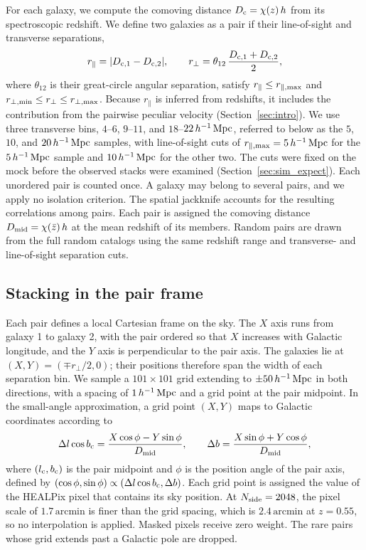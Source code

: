 For each galaxy, we compute the comoving distance $D_{\rm c}=\chi(z)\,h$ from
its spectroscopic redshift. We define two galaxies as a pair if their
line-of-sight and transverse separations,
\begin{equation}
  r_{\parallel} = |D_{{\rm c},1}-D_{{\rm c},2}|, \qquad
  r_{\perp} = \theta_{12}\,\frac{D_{{\rm c},1}+D_{{\rm c},2}}{2},
  \label{eq:separations}
\end{equation}
where $\theta_{12}$ is their great-circle angular separation, satisfy
$r_{\parallel}\leq r_{\parallel,{\rm max}}$ and
$r_{\perp,{\rm min}}\leq r_{\perp}\leq r_{\perp,{\rm max}}$. Because
$r_{\parallel}$ is inferred from redshifts, it includes the contribution from
the pairwise peculiar velocity (Section~\ref{sec:intro}). We
use three transverse bins, $4$--$6$, $9$--$11$, and $18$--$22\,h^{-1}\,{\rm Mpc}$,
referred to below as the $5$, $10$, and $20\,h^{-1}\,{\rm Mpc}$ samples, with
line-of-sight cuts of $r_{\parallel,{\rm max}}=5\,h^{-1}\,{\rm Mpc}$ for the
$5\,h^{-1}\,{\rm Mpc}$ sample and $10\,h^{-1}\,{\rm Mpc}$ for the other two. The cuts were
fixed on the mock before the observed stacks were examined
(Section~\ref{sec:sim_expect}). Each unordered pair is counted once. A
galaxy may belong to several pairs, and we apply no isolation criterion. The
spatial jackknife accounts for the resulting correlations among pairs. Each
pair is assigned the comoving distance
$D_{\rm mid}=\chi(\bar z)\,h$ at the mean redshift of its members. Random
pairs are drawn from the full random catalogs using the same redshift range
and transverse- and line-of-sight separation cuts.

\subsection{Stacking in the pair frame}
\label{sec:stacking}

Each pair defines a local Cartesian frame on the sky. The $X$ axis runs from
galaxy 1 to galaxy 2, with the pair ordered so that $X$ increases with
Galactic longitude, and the $Y$ axis is perpendicular to the pair axis. The
galaxies lie at $(X,Y)=(\mp r_{\perp}/2,0)$; their positions therefore span
the width of each separation bin. We sample a $101\times101$ grid extending
to $\pm50\,h^{-1}\,{\rm Mpc}$ in both directions, with a spacing of
$1\,h^{-1}\,{\rm Mpc}$ and a grid point at the pair midpoint. In the small-angle
approximation, a grid point $(X,Y)$ maps to Galactic coordinates according to
\begin{equation}
  \Delta l\cos b_{\rm c} = \frac{X\cos\phi - Y\sin\phi}{D_{\rm mid}}, \qquad
  \Delta b = \frac{X\sin\phi + Y\cos\phi}{D_{\rm mid}},
  \label{eq:grid_to_sky}
\end{equation}
where $(l_{\rm c},b_{\rm c})$ is the pair midpoint and $\phi$ is the
position angle of the pair axis, defined by
$(\cos\phi,\sin\phi)\propto(\Delta l\cos b_{\rm c},\Delta b)$.
Each grid point is assigned the value of the HEALPix pixel that contains its
sky position. At $N_{\rm side}=2048$, the pixel scale of
$1.7\,\mathrm{arcmin}$ is
finer than the grid spacing, which is $2.4\,\mathrm{arcmin}$ at $z=0.55$,
so no interpolation is applied. Masked pixels receive zero weight. The rare
pairs whose grid extends past a Galactic pole are dropped.

